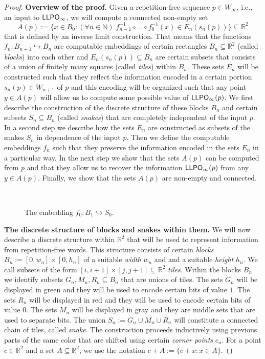 \documentclass[a4paper]{amsart}
\def\IN{{\mathbb{N}}}
\def\IR{{\mathbb{R}}}
\def\In{\subseteq}
\def\into{\hookrightarrow}
\def\LLPO{\text{\rm\sffamily LLPO}}
\def\LLPO{\mbox{\rm\sffamily LLPO}}
\theoremstyle{definition}
\begin{document}
\begin{proof}
\noindent
{\bf Overview of the proof.}
Given a repetition-free sequence $p\in W_\infty$, i.e., an input to $\LLPO_\infty$, we will compute a connected non-empty set
\[A(p):=\{x\in B_0:(\forall n\in\IN)\; f_{n-1}^{-1}\circ...\circ f_0^{-1}(x)\in E_n(s_n(p))\}\In\IR^2\]
that is defined by an inverse limit construction. That means that the functions $f_n:B_{n+1}\into B_n$ are computable
embeddings of certain rectangles $B_n\In\IR^2$ (called {\em blocks}) into each other and $E_n(s_n(p))\In B_n$ are certain subsets that consists
of a union of finitely many squares (called {\em tiles}) within $B_n$. These sets $E_n$ will be constructed such that
they reflect the information encoded in a certain portion $s_n(p)\in W_{n+1}$ of $p$ and this encoding will be organized such that
any point $y\in A(p)$ will allow us to compute some possible value of $\LLPO_\infty(p)$. 
We first describe the construction of the discrete structure of these blocks $B_n$ and certain subsets $S_n\In B_n$ (called {\em snakes})
that are completely independent of the input $p$. In a second step we describe how the sets $E_n$ are constructed as subsets of the snakes $S_n$ 
in dependence of the input $p$. Then we define the computable embeddings $f_n$ such that they preserve the information encoded in
the sets $E_n$ in a particular way. In the next step we show that the sets $A(p)$ can be computed from $p$ and that they allow us
to recover the information $\LLPO_\infty(p)$ from any $y\in A(p)$. Finally, we show that the sets $A(p)$ are non-empty and connected. \\

\begin{figure}[tb]
\begin{scriptsize}
\hspace*{-1cm}
\end{scriptsize}
\ \\[-0.6cm]
\caption{The embedding $f_0:B_1\into S_0$.}
\label{fig:f0}
\end{figure}

\noindent
{\bf The discrete structure of blocks and snakes within them.}
We will now describe a discrete structure within $\IR^2$ that will be used to represent information from repetition-free words. 
This structure consists of certain {\em blocks} $B_n := [0, w_n] \times [0,h_n]$
of a suitable {\em width} $w_n$ and and a suitable {\em height} $h_n$.
We call subsets of the form $[i,i+1]\times[j,j+1]\In\IR^2$ {\em tiles}.
Within the blocks $B_n$ we identify subsets $G_n,M_n,R_n\In B_n$ that 
are unions of tiles. The sets $G_n$ will be displayed in green and they will be used to encode certain bits of value $1$.
The sets $R_n$ will be displayed in red and they will be used to encode certain bits of value $0$.
The sets $M_n$ will be displayed in gray and they are middle sets that are used to separate bits. 
The union $S_n:=G_n\cup M_n\cup R_n$ will constitute a connected chain of tiles, called {\em snake}.
The construction proceeds inductively using previous parts
of the same color that are shifted using certain {\em corner points} $c_n$. 
For a point $c\in\IR^2$ and a set $A\In\IR^2$, we use the notation
$c+A:=\{c+x:x\in A\}$. 


\end{proof}
\end{document}
